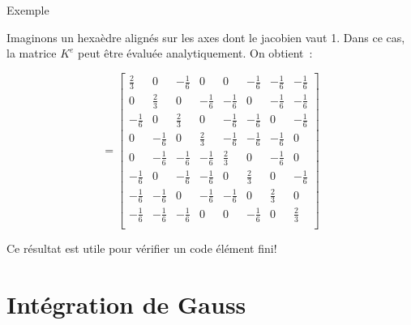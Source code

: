 \documentclass[
mode=present,    %
paper=a4paper,   %
orient=landscape,
display=slides,   %
size=10pt,     %
style=romain   %
]{powerdot}
\begin{document}
\begin{slide}[toc=]{Exemple}

Imaginons un hexaèdre alignés sur les axes dont le jacobien vaut 1. Dans ce cas, la matrice $K^e$ peut être évaluée analytiquement. On obtient~:

\begin{equation*}
[K^e]=
     \begin{bmatrix}
 \frac{2}{3}&     0      &-\frac{1}{6}&  0         &    0       &-\frac{1}{6}&-\frac{1}{6}&-\frac{1}{6}   \\
     0      &\frac{2}{3} &     0      &-\frac{1}{6}&-\frac{1}{6}&0           &-\frac{1}{6}&-\frac{1}{6}   \\
-\frac{1}{6}&0           &\frac{2}{3} &     0      &-\frac{1}{6}&-\frac{1}{6}&0           &-\frac{1}{6}   \\
0           &-\frac{1}{6}&0           &\frac{2}{3} &-\frac{1}{6}&-\frac{1}{6}&-\frac{1}{6}&0              \\
0           &-\frac{1}{6}&-\frac{1}{6}&-\frac{1}{6}&\frac{2}{3} & 0          &-\frac{1}{6}&0              \\
-\frac{1}{6}&0           &-\frac{1}{6}&-\frac{1}{6}&0           &\frac{2}{3} &0           &-\frac{1}{6}   \\
-\frac{1}{6}&-\frac{1}{6}&0           &-\frac{1}{6}&-\frac{1}{6}&0           &\frac{2}{3} &0              \\
-\frac{1}{6}&-\frac{1}{6}&-\frac{1}{6}&0           & 0          &-\frac{1}{6}&0           &\frac{2}{3}    \\
    \end{bmatrix}
\end{equation*}

\bigskip

Ce résultat est utile pour vérifier un code élément fini!

\end{slide}



\section{Intégration de Gauss}
\end{document}
